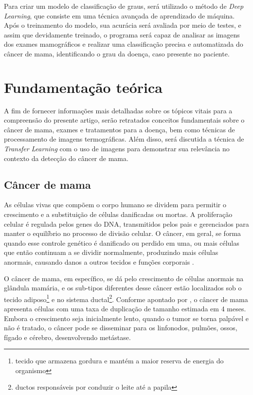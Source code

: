 
Para criar um modelo de classificação de graus, será utilizado o método de \textit{Deep Learning}, que consiste em uma técnica avançada de aprendizado de máquina. Após o treinamento do modelo, sua acurácia será avaliada por meio de testes, e assim que devidamente treinado, o programa será capaz de analisar as imagens dos exames mamográficos e realizar uma classificação precisa e automatizada do câncer de mama, identificando o grau da doença, caso presente no paciente.







\section{Fundamentação teórica} 
A fim de fornecer informações mais detalhadas sobre os tópicos vitais para a compreensão do presente artigo, serão retratados conceitos fundamentais sobre o câncer de mama, exames e tratamentos para a doença, bem como técnicas de processamento de imagens termográficas. Além disso, será discutida a técnica de \textit{Transfer Learning} com o uso de imagens para demonstrar sua relevância no contexto da detecção do câncer de mama.

\subsection{Câncer de mama}
As células vivas que compõem o corpo humano se dividem para permitir o crescimento e a substituição de células danificadas ou mortas. A proliferação celular é regulada pelos genes do DNA, transmitidos pelos pais e gerenciados para manter o equilíbrio no processo de divisão celular. O câncer, em geral, se forma quando esse controle genético é danificado ou perdido em uma, ou mais células que então continuam a se dividir normalmente, produzindo mais células anormais, causando danos a outros tecidos e funções corporais \cite{basicOncology}.

O câncer de mama, em específico, se dá pelo crescimento de células anormais na glândula mamária, e os sub-tipos diferentes desse câncer estão localizados sob o tecido adiposo\footnote{tecido que armazena gordura e mantém a maior reserva de energia do organismo} e no sistema ductal\footnote{ductos responsáveis por conduzir o leite até a papila}. Conforme apontado por , o câncer de mama apresenta células com uma taxa de duplicação de tamanho estimada em 4 meses. Embora o crescimento seja inicialmente lento, quando o tumor se torna palpável e não é tratado, o câncer pode se disseminar para os linfonodos, pulmões, ossos, fígado e cérebro, desenvolvendo metástase.

